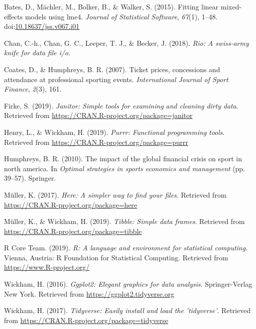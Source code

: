 \documentclass[man, fleqn, noextraspace,floatsintext]{apa6}
\begin{document}
\leavevmode\hypertarget{ref-R-lme4}{}%
Bates, D., Mächler, M., Bolker, B., \& Walker, S. (2015). Fitting linear mixed-effects models using lme4. \emph{Journal of Statistical Software}, \emph{67}(1), 1--48. doi:\href{https://doi.org/10.18637/jss.v067.i01}{10.18637/jss.v067.i01}

\leavevmode\hypertarget{ref-R-rio}{}%
Chan, C.-h., Chan, G. C., Leeper, T. J., \& Becker, J. (2018). \emph{Rio: A swiss-army knife for data file i/o}.

\leavevmode\hypertarget{ref-coates_humphreys_2007}{}%
Coates, D., \& Humphreys, B. R. (2007). Ticket prices, concessions and attendance at professional sporting events. \emph{International Journal of Sport Finance}, \emph{2}(3), 161.

\leavevmode\hypertarget{ref-R-janitor}{}%
Firke, S. (2019). \emph{Janitor: Simple tools for examining and cleaning dirty data}. Retrieved from \url{https://CRAN.R-project.org/package=janitor}

\leavevmode\hypertarget{ref-R-purrr}{}%
Henry, L., \& Wickham, H. (2019). \emph{Purrr: Functional programming tools}. Retrieved from \url{https://CRAN.R-project.org/package=purrr}

\leavevmode\hypertarget{ref-humphreys_2010}{}%
Humphreys, B. R. (2010). The impact of the global financial crisis on sport in north america. In \emph{Optimal strategies in sports economics and management} (pp. 39--57). Springer.

\leavevmode\hypertarget{ref-R-here}{}%
Müller, K. (2017). \emph{Here: A simpler way to find your files}. Retrieved from \url{https://CRAN.R-project.org/package=here}

\leavevmode\hypertarget{ref-R-tibble}{}%
Müller, K., \& Wickham, H. (2019). \emph{Tibble: Simple data frames}. Retrieved from \url{https://CRAN.R-project.org/package=tibble}

\leavevmode\hypertarget{ref-R-base}{}%
R Core Team. (2019). \emph{R: A language and environment for statistical computing}. Vienna, Austria: R Foundation for Statistical Computing. Retrieved from \url{https://www.R-project.org/}

\leavevmode\hypertarget{ref-R-ggplot2}{}%
Wickham, H. (2016). \emph{Ggplot2: Elegant graphics for data analysis}. Springer-Verlag New York. Retrieved from \url{https://ggplot2.tidyverse.org}

\leavevmode\hypertarget{ref-R-tidyverse}{}%
Wickham, H. (2017). \emph{Tidyverse: Easily install and load the 'tidyverse'}. Retrieved from \url{https://CRAN.R-project.org/package=tidyverse}
\end{document}
